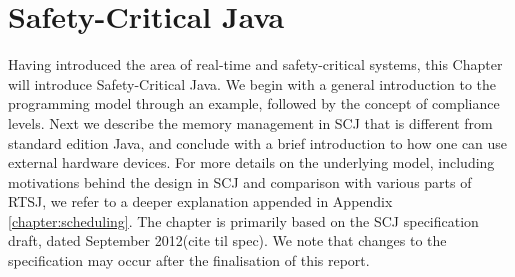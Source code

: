 \chapter{Safety-Critical Java}
\label{chapter:scj}
Having introduced the area of real-time and safety-critical systems, this Chapter will introduce Safety-Critical Java. We begin with a general introduction to the programming model through an example, followed by the concept of compliance levels. Next we describe the memory management in SCJ that is different from standard edition Java, and conclude with a brief introduction to how one can use external hardware devices. For more details on the underlying model, including motivations behind the design in SCJ and comparison with various parts of RTSJ, we refer to a deeper explanation appended in Appendix \ref{chapter:scheduling}.
 The chapter is primarily based on the SCJ specification draft, dated September 2012(cite til spec). We note that changes to the specification may occur after the finalisation of this report.
